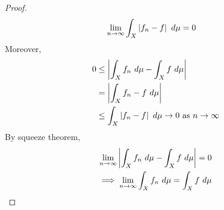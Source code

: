 \documentclass[11pt]{article}
\begin{document}
\begin{proof}
	    \begin{align}
	        \lim_{n \to \infty}\int_X \left \vert {f_n - f} \right \vert\ d\mu &= 0 \label{eq:3}
	    \end{align}
	    Moreover,
	    \begin{align}
	        0 &\leq \left \vert {\int_X f_n\ d\mu - \int_X f\ d\mu} \right \vert \\
	        &= \left \vert {\int_X f_n - f\ d\mu} \right \vert \\
	        &\leq \int_X \left \vert {f_n - f} \right \vert\ d\mu \to 0 \text{{ as }} n \to \infty
	    \end{align}
	    By squeeze theorem,
	    \begin{align}
	        \lim_{n \to \infty} \abs{\int_X f_n\ d\mu - \int_X f\ d\mu} = 0 \\
	        \implies \lim_{n \to \infty} \int_X f_n\ d\mu = \int_X f\ d\mu
	    \end{align}
	\end{proof}
\end{document}
